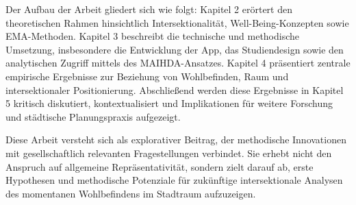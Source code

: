 Der Aufbau der Arbeit gliedert sich wie folgt: Kapitel 2 erörtert den theoretischen Rahmen hinsichtlich Intersektionalität, Well-Being-Konzepten sowie EMA-Methoden. Kapitel 3 beschreibt die technische und methodische Umsetzung, insbesondere die Entwicklung der App, das Studiendesign sowie den analytischen Zugriff mittels des MAIHDA-Ansatzes. Kapitel 4 präsentiert zentrale empirische Ergebnisse zur Beziehung von Wohlbefinden, Raum und intersektionaler Positionierung. Abschließend werden diese Ergebnisse in Kapitel 5 kritisch diskutiert, kontextualisiert und Implikationen für weitere Forschung und städtische Planungspraxis aufgezeigt.

Diese Arbeit versteht sich als explorativer Beitrag, der methodische Innovationen mit gesellschaftlich relevanten Fragestellungen verbindet. Sie erhebt nicht den Anspruch auf allgemeine Repräsentativität, sondern zielt darauf ab, erste Hypothesen und methodische Potenziale für zukünftige intersektionale Analysen des momentanen Wohlbefindens im Stadtraum aufzuzeigen.
